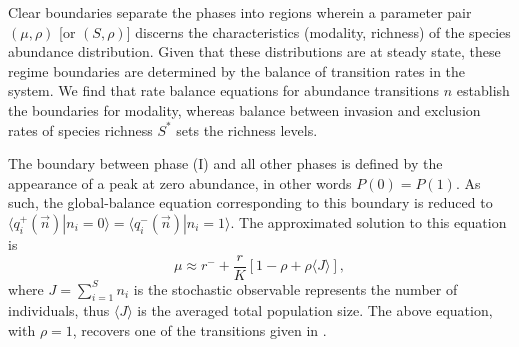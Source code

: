 \documentclass[%
 amsmath,amssymb,
reprint,%
linenumbers]{revtex4-2}
\begin{document}
 
Clear boundaries separate the phases into regions wherein a parameter pair $(\mu,\rho)$ [or $(S,\rho)$] discerns the characteristics (modality, richness) of the species abundance distribution.
Given that these distributions are at steady state, these regime boundaries are determined by the balance of transition rates in the system.
We find that rate balance equations for abundance transitions $n$ establish the boundaries for modality, whereas balance between invasion and exclusion rates of species richness $S^*$ sets the richness levels.

\iffalse
\begin{center}
\begin{tabular}{lccc}
\hline
\multirow{2}{4em}{\textcolor{black}{modality:}} & &
      \textcolor{black}{$R_n(n^* \rightarrow n^* +1)=R_n(n^*+1 \rightarrow n^*)$} \\ &
     & \textcolor{black}{$R_n(0 \rightarrow 1)=R_n(1 \rightarrow 0)$}   \\
    \hline 
    \multirow{2}{4em}{\textcolor{black}{richness:}}  & & \textcolor{black}{$R_{S^*}(1 \rightarrow 2)=R_{S^*}(2 \rightarrow 1)$} \\ &
     & \textcolor{black}{$R_{S^*}(S \rightarrow S-1)=R_{S^*}(S-1 \rightarrow S)$}
\\
\hline
\end{tabular}    
\end{center}

\fi

The boundary between phase (I)  and all other phases is defined by the appearance of a peak at zero abundance, in other words $P(0)=P(1)$.
As such, the global-balance equation corresponding to this boundary is reduced to
$\langle q_i^+(\vec{n})|n_i=0 \rangle=\langle q_i^-(\vec{n})|n_i=1 \rangle$.
The approximated solution to this equation is
\begin{equation}
    \mu \approx r^- +\frac{r}{K}[1-\rho+\rho \langle J\rangle ],
\end{equation}
where $J=\sum_{i=1}^S n_i$ is the stochastic observable represents the number of individuals, thus $\langle J \rangle$ is the averaged total population size.  The above equation, with $\rho=1$, recovers one of the transitions given in  \cite{xu2018immigration}.
\end{document}
